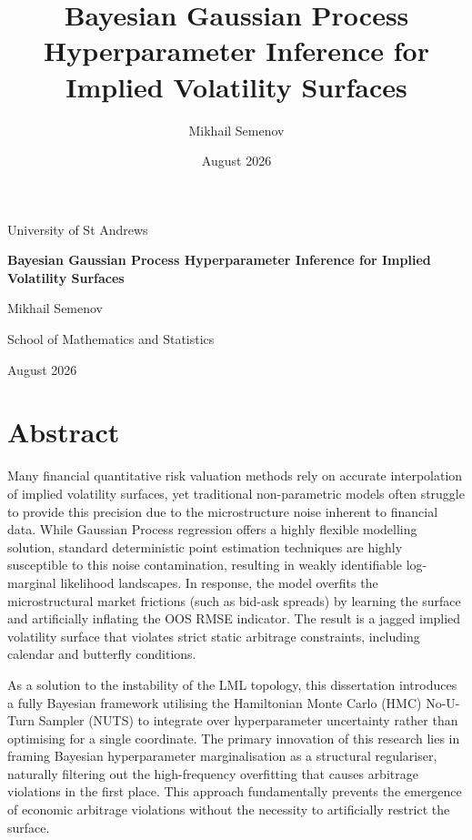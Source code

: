 \documentclass[12pt,oneside]{report}
\title{Bayesian Gaussian Process Hyperparameter Inference for Implied Volatility Surfaces}
\author{Mikhail Semenov}
\date{August 2026}
\theoremstyle{definition}
\theoremstyle{remark}
\begin{document}
\begin{titlepage}
    \centering
    \vspace*{2cm}
    {\Large University of St Andrews\par}
    \vspace{1.5cm}
    {\Huge \bfseries Bayesian Gaussian Process Hyperparameter Inference for Implied Volatility Surfaces\par}
    \vspace{1.5cm}
    \vspace{2cm}
    {\Large Mikhail Semenov\par}
    \vfill
    {\large School of Mathematics and Statistics\par}
    {\large August 2026\par}
\end{titlepage}


\chapter*{Abstract}
Many financial quantitative risk valuation methods rely on accurate interpolation of implied volatility surfaces, yet traditional non-parametric models often struggle to provide this precision due to the microstructure noise inherent to financial data. While Gaussian Process regression offers a highly flexible modelling solution, standard deterministic point estimation techniques are highly susceptible to this noise contamination, resulting in weakly identifiable log-marginal likelihood landscapes. In response, the model overfits the microstructural market frictions (such as bid-ask spreads) by learning the surface and artificially inflating the OOS RMSE indicator. The result is a jagged implied volatility surface that violates strict static arbitrage constraints, including calendar and butterfly conditions.

As a solution to the instability of the LML topology, this dissertation introduces a fully Bayesian framework utilising the Hamiltonian Monte Carlo (HMC) No-U-Turn Sampler (NUTS) to integrate over hyperparameter uncertainty rather than optimising for a single coordinate. The primary innovation of this research lies in framing Bayesian hyperparameter marginalisation as a structural regulariser, naturally filtering out the high-frequency overfitting that causes arbitrage violations in the first place. This approach fundamentally prevents the emergence of economic arbitrage violations without the necessity to artificially restrict the surface.
\end{document}
